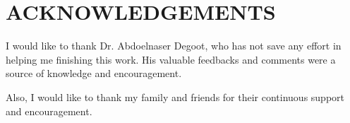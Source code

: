 \chapter*{ACKNOWLEDGEMENTS}
%

 I would like to thank Dr. Abdoelnaser Degoot, who has not save any effort in helping me finishing this work.  His valuable feedbacks and comments were a source of knowledge and encouragement.
  
Also, I would like to thank my family and friends for their continuous support and encouragement.

\
\

\
\
\
\

\


